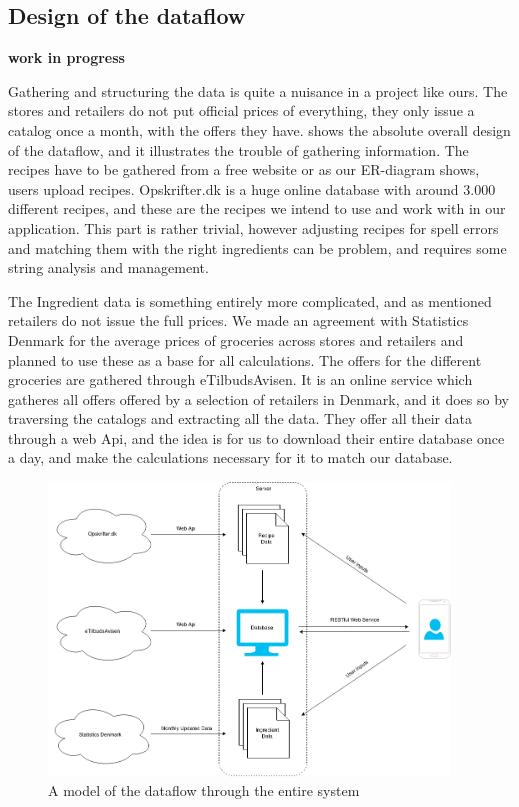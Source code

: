\subsection{Design of the dataflow}\label{subsec:dataflow}

\textbf{work in progress}

Gathering and structuring the data is quite a nuisance in a project like ours. The stores and retailers do not put official prices of everything, they only issue a catalog once a month, with the offers  they have.  shows the absolute overall design of the dataflow, and it illustrates the trouble of gathering information. The recipes have to be gathered from a free website or as our ER-diagram shows, users upload recipes. Opskrifter.dk is a huge online database with around 3.000 different recipes, and these are the recipes we intend to use and work with in our application. This part is rather trivial, however adjusting recipes for spell errors and matching them with the right ingredients can be problem, and requires some string analysis and management.

The Ingredient data is something entirely more complicated, and as mentioned retailers do not issue the full prices. We made an agreement with Statistics Denmark for the average prices of groceries across stores and retailers and planned to use these as a base for all calculations. The offers for the different groceries are gathered through eTilbudsAvisen. It is an online service which gatheres all offers offered by a selection of retailers in Denmark, and it does so by traversing the catalogs and extracting all the data. They offer all their data through a web Api, and the idea is for us to download their entire database once a day, and make the calculations necessary for it to match our database. 

\begin{figure}
\label{fig:dataflow}
\centering
\includegraphics[width=0.95\textwidth]{Pictures/dataflow}
\caption{A model of the dataflow through the entire system}
\end{figure}

